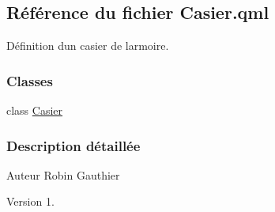 \hypertarget{_casier_8qml}{}\subsection{Référence du fichier Casier.\+qml}
\label{_casier_8qml}


Définition d\textquotesingle{}un casier de l\textquotesingle{}armoire.  


\subsubsection*{Classes}
\begin{DoxyCompactItemize}
\item 
class \hyperlink{class_casier}{Casier}
\end{DoxyCompactItemize}


\subsubsection{Description détaillée}
\begin{DoxyAuthor}{Auteur}
Robin Gauthier
\end{DoxyAuthor}
\begin{DoxyVersion}{Version}
1. 
\end{DoxyVersion}
